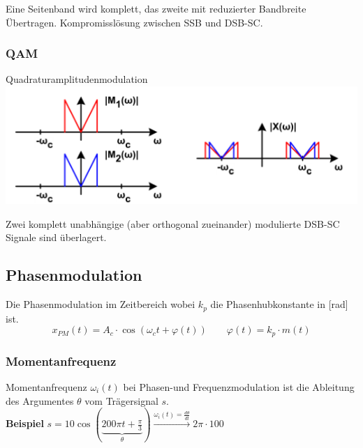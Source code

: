Eine Seitenband wird komplett, das zweite mit reduzierter Bandbreite Übertragen. Kompromisslösung zwischen SSB und DSB-SC.

\subsubsection{QAM}
Quadraturamplitudenmodulation\\
\includegraphics[width=0.5\columnwidth]{Images/qam}

Zwei komplett unabhängige (aber orthogonal zueinander) modulierte DSB-SC Signale sind überlagert.


\subsection{Phasenmodulation}
Die Phasenmodulation im Zeitbereich wobei $k_p$ die Phasenhubkonstante in [rad] ist.
\[
x_{PM}(t) = A_c\cdot \cos(\omega_ct + \varphi(t)) \qquad \varphi(t) = k_p\cdot m(t)
\]

\subsubsection{Momentanfrequenz}
Momentanfrequenz $\omega_i(t)$ bei Phasen-und Frequenzmodulation ist die Ableitung des Argumentes $\theta$ vom Trägersignal $s$.\\ \textbf{Beispiel }$s = 10\cos(\underbrace{200\pi t + \frac{\pi}{3}}_\theta) \xrightarrow{\omega_i(t) = \frac{d\theta}{dt}}  2\pi \cdot 100$


